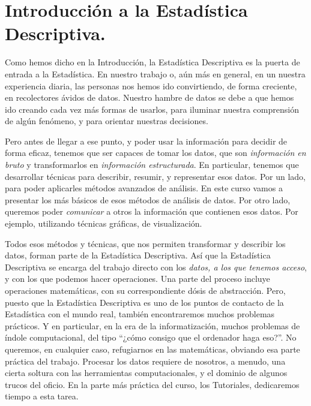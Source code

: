 
\section*{Introducción a la Estadística Descriptiva.}
\label{part01:intro}

Como hemos dicho en la Introducción, la Estadística Descriptiva es la puerta de entrada a la
Estadística. En nuestro trabajo o, aún más en general, en un nuestra experiencia diaria, las
personas nos hemos ido convirtiendo, de forma creciente, en recolectores ávidos de datos. Nuestro
hambre de datos se debe a que hemos ido creando cada vez más formas de usarlos, para iluminar
nuestra comprensión de algún fenómeno, y para orientar nuestras decisiones.

Pero antes de llegar a ese punto, y poder usar la información para decidir de forma eficaz, tenemos
que ser capaces de tomar los datos, que son {\em información en bruto} y transformarlos en {\em
información estructurada}. En particular, tenemos que desarrollar técnicas para describir, resumir,
y representar esos datos. Por un lado, para poder aplicarles métodos avanzados de análisis. En este
curso vamos a presentar los más básicos de esos métodos de análisis de datos. Por otro lado,
queremos poder {\em comunicar} a otros la información que contienen esos datos. Por ejemplo,
utilizando técnicas gráficas, de visualización.

Todos esos métodos y técnicas, que nos permiten transformar y describir los datos, forman parte de
la  {\sf Estadística Descriptiva}. Así que la Estadística
Descriptiva se encarga del trabajo directo con los {\em datos, a los que tenemos acceso}, y con los
que podemos hacer operaciones. Una parte del proceso incluye operaciones matemáticas, con su
correspondiente dósis de abstracción. Pero, puesto que la Estadística Descriptiva es uno de los
puntos de contacto de la Estadística con el mundo real, también encontraremos muchos problemas
prácticos. Y en particular, en la era de la informatización, muchos problemas de índole
computacional, del tipo ``¿cómo consigo que el ordenador haga eso?''. No queremos, en cualquier caso,
refugiarnos en las matemáticas, obviando esa parte práctica del trabajo. Procesar los datos requiere de
nosotros, a menudo, una cierta soltura con las herramientas computacionales, y el dominio de
algunos trucos del oficio. En la parte más práctica del curso, los Tutoriales, dedicaremos tiempo a
esta tarea.

